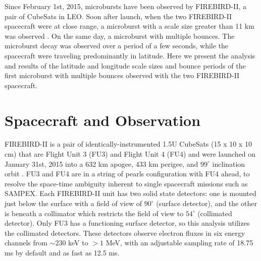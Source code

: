 \documentclass[draft, linenumbers]{agujournal}
\begin{document}
Since February 1st, 2015, microbursts have been observed by FIREBIRD-II, a pair of CubeSats in LEO. Soon after launch, when the two FIREBIRD-II spacecraft were at close range, a microburst with a scale size greater than 11 km was observed \citep{Crew2016}. On the same day,  a microburst with multiple bounces.  The microburst decay was observed over a period of a few seconds, while the spacecraft were traveling predominantly in latitude. Here we present the analysis and results of the latitude and longitude scale sizes and bounce periods of the first microburst with multiple bounces observed with the two FIREBIRD-II spacecraft.


\section{Spacecraft and Observation} \label{obs} %
FIREBIRD-II is a pair of identically-instrumented 1.5U CubeSats (15 x 10 x 10 cm) that are  Flight Unit 3 (FU3) and Flight Unit 4 (FU4) and were launched on January 31st, 2015 into a 632 km apogee, 433 km perigee, and $99^{\circ}$ inclination orbit \citep{Crew2016}. FU3 and FU4 are  in a string of pearls configuration with FU4 ahead, to resolve the space-time ambiguity inherent to single spacecraft missions such as SAMPEX. Each FIREBIRD-II unit has two solid state detectors: one is mounted just below the surface with a field of view of $90^{\circ}$ (surface detector), and the other is beneath a collimator which restricts the field of view to $54^{\circ}$ (collimated detector). Only FU3 has a functioning surface detector, so this analysis utilizes the collimated detectors. These detectors observe electron fluxes in six energy channels from $\sim 230$ keV to $> 1$ MeV, with an adjustable sampling rate of 18.75 ms by default and as fast as 12.5 ms. 
\end{document}
